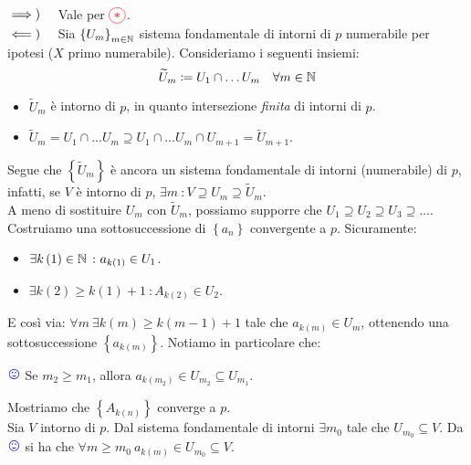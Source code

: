\begin{demonstration}~{}\\
	$\implies)\quad$ Vale per $\textcolor{red}{\circled{\ast}}$.\\
	$\impliedby)\quad$ Sia $\left\{U_m\right\}_{m\in\mathbb{N}}$ sistema fondamentale di intorni di $p$ numerabile per ipotesi ($X$ primo numerabile). Consideriamo i seguenti insiemi:
	\begin{equation*}
	\widetilde{U}_m\coloneqq U_1\cap\ldots U_m\quad \forall m\in \mathbb{N}
	\end{equation*}
\begin{itemize}
	\item $\widetilde{U}_m$ è intorno di $p$, in quanto intersezione \textit{finita} di intorni di $p$.
	\item $\widetilde{U}_m=U_1\cap\ldots U_m\supseteq U_1\cap\ldots U_m\cap U_{m+1}=\widetilde{U}_{m+1}$.
\end{itemize}
Segue che $\left\{\widetilde{U}_m\right\}$ è ancora un sistema fondamentale di intorni (numerabile) di $p$, infatti, se $V$ è intorno di $p$, $\exists m\ \colon V\supseteq U_m\supseteq \widetilde{U}_m$.\\
A meno di sostituire $U_m$ con $\widetilde{U}_m$, possiamo supporre che $U_1\supseteq U_2\supseteq U_3\supseteq \ldots$.\\
Costruiamo una sottosuccessione di $\left\{a_n\right\}$ convergente a $p$. Sicuramente:
\begin{itemize}
	\item $\exists k\left(1\right)\in \mathbb{N}\ \colon a_{k\left(1\right)}\in U_1$.
	\item $\exists k\left(2\right)\geq k\left(1\right)+1\ \colon A_{k\left(2\right)}\in U_2$.
\end{itemize}
E così via: $\forall m\ \exists k\left(m\right)\geq k\left(m-1\right)+1$ tale che $a_{k\left(m\right)}\in U_m$, ottenendo una sottosuccessione $\left\{a_{k\left(m\right)}\right\}$. Notiamo in particolare che:
\begin{center}
\label{notasorridente} $\textcolor{blue}{{\large \smiley{}}}$ Se $m_2\geq m_1$, allora $a_{k\left(m_2\right)}\in U_{m_2}\subseteq U_{m_1}$.
\end{center}
Mostriamo che $\left\{A_{k\left(n\right)}\right\}$ converge a $p$.\\
Sia $V$ intorno di $p$. Dal sistema fondamentale di intorni $\exists m_0$ tale che $U_{m_0}\subseteq V$. Da $\textcolor{blue}{{\large \smiley{}}}$ si ha che $\forall m\geq m_0\ a_{k\left(m\right)}\in U_{m_0}\subseteq V$.
\end{demonstration}
